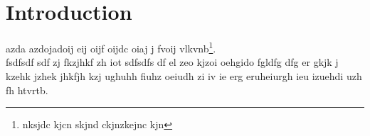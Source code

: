 \chapter*{Introduction}


azda azdojadoij eij oijf oijdc oiaj j fvoij vlkvnb\footnote{nksjdc kjcn skjnd ckjnzkejnc kjn}.\\
fsdfsdf sdf zj fkzjhkf zh \gls{iot} sdfsdfs df el zeo kjzoi oehg\gls{ido} fgldfg dfg  er gkjk j kzehk jzhek jhkfjh kzj ughuhh fiuhz oeiudh zi iv ie  
erg eruheiurgh ieu izuehdi uzh fh htvrtb.
